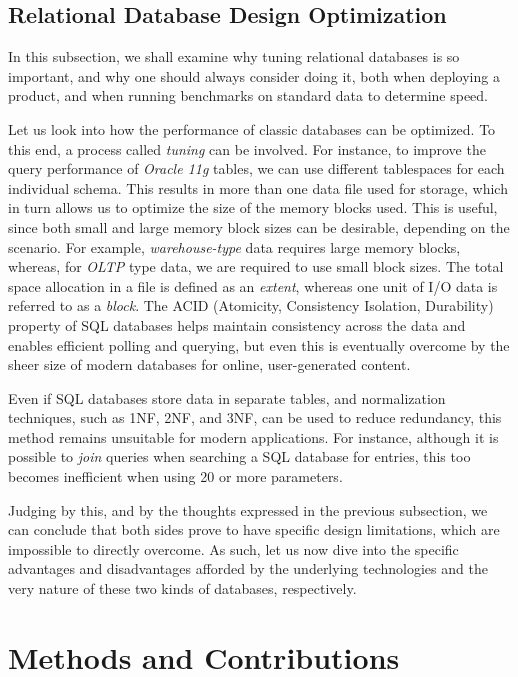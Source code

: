 \documentclass[10pt,        %
               a4paper,     %
               journal,     %
               ]{IEEEtran}
\begin{document}
\subsection{Relational Database Design Optimization}
In this subsection, we shall examine why tuning relational databases is so important, and why one should always consider doing it, both when deploying a product, and when running benchmarks on standard data to determine speed. \par
Let us look into how the performance of classic databases can be optimized. To this end, a process called \textit{tuning} can be involved. For instance, to improve the query performance of \textit{Oracle 11g} tables, we can use different tablespaces for each individual schema.  This results in more than one data file used for storage, which in turn allows us to optimize the size of the memory blocks used. This is useful, since both small and large memory block sizes can be desirable, depending on the scenario. For example, \textit{warehouse-type} data requires large memory blocks, whereas, for \textit{OLTP} type data, we are required to use small block sizes. The total space allocation in a file is defined as an \textit{extent}, whereas one unit of I/O data is referred to as a \textit{block}. 
The ACID (Atomicity, Consistency Isolation, Durability) property of SQL databases helps maintain consistency across the data and enables efficient polling and querying, but even this is eventually overcome by the sheer size of modern databases for online, user-generated content. \par
Even if SQL databases store data in separate tables, and normalization techniques, such as 1NF, 2NF, and 3NF, can be used to reduce redundancy, this method remains unsuitable for modern applications. For instance, although it is possible to \textit{join} queries when searching a SQL database for entries, this too becomes inefficient when using 20 or more parameters. \par
Judging by this, and by the thoughts expressed in the previous subsection, we can conclude that both sides prove to have specific design limitations, which are impossible to directly overcome. As such, let us now dive into the specific advantages and disadvantages afforded by the underlying technologies and the very nature of these two kinds of databases, respectively. 

\section{Methods and Contributions}
\end{document}
